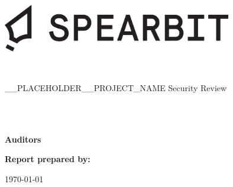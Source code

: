 \begin{titlepage}
  \vbox{}
  \vbox{}

  \begin{center}

    \includegraphics[width=0.75\textwidth]{img/spearbit_wordmark_black.png}
    \vspace{5cm}

    \noindent\makebox[\linewidth]{\rule{.7\paperwidth}{.6pt}}\\[0.7cm]

    { \huge \bfseries

      __PLACEHOLDER__PROJECT_NAME Security Review
    }\\[0.25cm]
    
    \noindent\makebox[\linewidth]{\rule{.7\paperwidth}{.6pt}}\\[0.7cm]

    
    \vfill


    \Large
    {\bfseries Auditors}\\

    \vspace{0.2cm}
    
    \vspace{1cm}


    \normalsize
    {\bfseries Report prepared by:} \\
    \vspace{1cm}

    {\normalsize \today}



  \end{center}

\end{titlepage}
